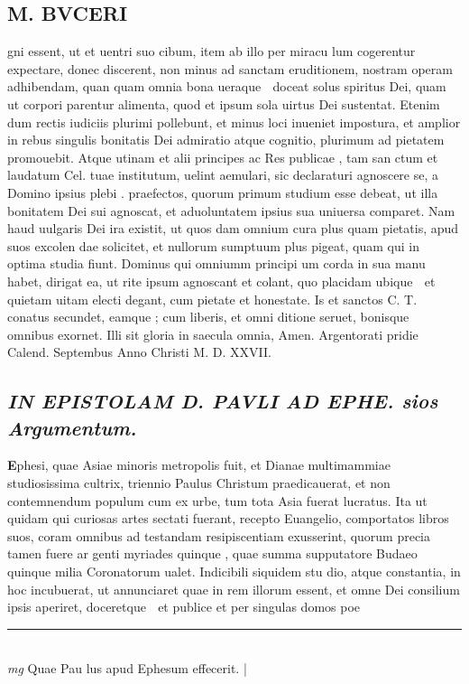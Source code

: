 \documentclass{article}
\begin{document}
\begin{pages}
\section*{M. BVCERI }\pstart gni essent, ut et uentri suo cibum, item ab illo per miracu lum cogerentur expectare, donec discerent, non minus ad sanctam eruditionem, nostram operam adhibendam, quan quam omnia bona ueraque  doceat solus spiritus Dei, quam ut corpori parentur alimenta, quod et ipsum sola uirtus Dei sustentat.  Etenim dum rectis iudiciis plurimi pollebunt, et minus loci inueniet impostura, et amplior in rebus singulis bonitatis Dei admiratio atque cognitio, plurimum ad pietatem promouebit.   \pend\pstart Atque utinam et alii principes ac Res publicae , tam san ctum et laudatum Cel.  tuae institutum, uelint aemulari, sic declaraturi agnoscere se, a Domino ipsius plebi .  praefectos, quorum primum studium esse debeat, ut illa bonitatem Dei sui agnoscat, et aduoluntatem ipsius sua uniuersa comparet. Nam haud uulgaris Dei ira existit, ut quos dam omnium cura plus quam pietatis, apud suos excolen dae solicitet, et nullorum sumptuum plus pigeat, quam qui in optima studia fiunt.  Dominus qui omniumm principi um corda in sua manu habet, dirigat ea, ut rite ipsum agnoscant et colant, quo placidam ubique  et quietam uitam electi degant, cum pietate et honestate.  Is et sanctos C. T.  conatus secundet, eamque ; cum liberis, et omni ditione seruet, bonisque  omnibus exornet.  Illi sit gloria in saecula omnia, Amen.  Argentorati pridie Calend.  Septembus   Anno Christi M. D. XXVII.  \pend
{}
{}
\subsection*{\textit{IN EPISTOLAM D. PAVLI AD EPHE.  sios Argumentum.  }}\pstart \huge\textbf{E}\normalsize phesi, quae Asiae minoris metropolis fuit, et Dianae multimammiae studiosissima cultrix, triennio Paulus Christum praedicauerat, et non contemnendum populum cum ex urbe, tum tota Asia fuerat lucratus.  Ita ut quidam qui curiosas artes sectati fuerant, recepto Euangelio, comportatos libros suos, coram omnibus ad testandam resipiscentiam exusserint, quorum precia tamen fuere ar genti myriades quinque  , quae summa supputatore Budaeo quinque  milia Coronatorum ualet.  Indicibili siquidem stu dio, atque  constantia, in hoc incubuerat, ut annunciaret quae in rem illorum essent, et omne Dei consilium ipsis aperiret, doceretque  et publice et per singulas domos poe\pend
\vspace{0.5cm}\noindent
\vspace{0.2cm}\rule{1cm}{0.2pt}\\ 
\hspace{0.2cm}\textit{mg}
\footnotesize Quae Pau lus apud Ephesum effecerit.  
\normalsize| 

\end{pages}
\end{document}

